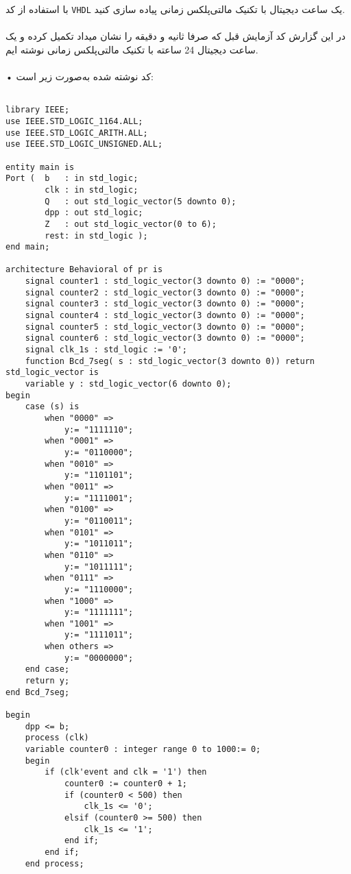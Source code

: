 \documentclass[12pt]{exam}
\begin{document}
\begin{questions}

\question
با استفاده از کد \texttt{VHDL} یک ساعت دیجیتال با تکنیک مالتی‌پلکس زمانی پیاده سازی کنید. \\ \\
در این گزارش کد آزمایش قبل که صرفا ثانیه و دقیقه را نشان میداد تکمیل کرده و یک ساعت دیجیتال 24 ساعته با تکنیک مالتی‌پلکس زمانی نوشته ایم. \\ \\
• کد نوشته شده به‌صورت زیر است: 


\begin{latin}
\begin{lstlisting}[style=vhdl,caption={Example VHDL code}]
	
library IEEE;
use IEEE.STD_LOGIC_1164.ALL;
use IEEE.STD_LOGIC_ARITH.ALL;
use IEEE.STD_LOGIC_UNSIGNED.ALL;

entity main is
Port (  b 	: in std_logic;
		clk : in std_logic;
		Q	: out std_logic_vector(5 downto 0);
		dpp : out std_logic;
		Z 	: out std_logic_vector(0 to 6);
		rest: in std_logic );
end main;

architecture Behavioral of pr is
	signal counter1 : std_logic_vector(3 downto 0) := "0000";
	signal counter2 : std_logic_vector(3 downto 0) := "0000";
	signal counter3 : std_logic_vector(3 downto 0) := "0000";
	signal counter4 : std_logic_vector(3 downto 0) := "0000";
	signal counter5 : std_logic_vector(3 downto 0) := "0000";
	signal counter6 : std_logic_vector(3 downto 0) := "0000";
	signal clk_1s : std_logic := '0';
	function Bcd_7seg( s : std_logic_vector(3 downto 0)) return std_logic_vector is                           
	variable y : std_logic_vector(6 downto 0);
begin
	case (s) is
		when "0000" =>
			y:= "1111110";
		when "0001" =>
			y:= "0110000";
		when "0010" =>
			y:= "1101101";
		when "0011" =>
			y:= "1111001";
		when "0100" =>
			y:= "0110011";
		when "0101" =>
			y:= "1011011";
		when "0110" =>
			y:= "1011111";
		when "0111" =>
			y:= "1110000";
		when "1000" =>
			y:= "1111111";
		when "1001" =>
			y:= "1111011";
		when others =>
			y:= "0000000";
	end case;
	return y;
end Bcd_7seg;

begin
	dpp <= b;
	process (clk)
	variable counter0 : integer range 0 to 1000:= 0;
	begin
		if (clk'event and clk = '1') then
			counter0 := counter0 + 1;
			if (counter0 < 500) then
				clk_1s <= '0';
			elsif (counter0 >= 500) then
				clk_1s <= '1';
			end if;
		end if;
	end process;
	

\end{lstlisting}
\end{latin}
\end{questions}
\end{document}
